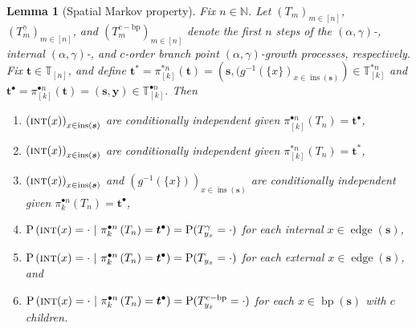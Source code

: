 \documentclass[a4paper, final]{amsart}
\theoremstyle{plain}
\newtheorem{lemma}[thm]{Lemma}
\theoremstyle{definition}
\newcommand{\tree}[1][t]{\boldsymbol{#1}}
\newcommand{\T}{\mathbb{T}}
\DeclareMathOperator{\edge}{edge}
\DeclareMathOperator{\insertable}{ins}
\DeclareMathOperator{\branchpoints}{bp}
\DeclareMathOperator{\intstruct}{\textsc{int}}
\newcommand{\insertablef}[1][\tree]{\insertable({\tree[#1]})}
\renewcommand{\P}{\mathrm{P}}
\newcommand{\N}{\mathbb{N}}
\begin{document}
\begin{lemma}[Spatial Markov property]\label{lemma:spatialMarkovProperty}
  Fix $n \in \N$.
  Let ${\left( T_m \right)}_{m \in [n]}$, ${\left( T_m^\gamma \right)}_{m \in [n]}$, and ${\left( T_m^{c-\text{bp}} \right)}_{m \in [n]}$ denote the first $n$ steps of the $(\alpha, \gamma)$-, internal $(\alpha, \gamma)$-, and $c$-order branch point $(\alpha, \gamma)$-growth processes, respectively.
  Fix $\tree \in \T_{[n]}$, and define $\tree^* = \pi_{[k]}^{*n} (\tree) = (\tree[s], {(g^{-1}(\{x\})}_{x \in \insertablef[s]}) \in \T_{[k]}^{*n}$ and $\tree^\bullet = \pi_{[k]}^{\bullet n} (\tree) = (\tree[s], \mathbf{y}) \in \T_{[k]}^{\bullet n}$.
Then
%
\begin{enumerate}
  \item\label{lemma:spatial1} ${\left( \intstruct (x) \right)}_{x \in \insertablef[s]}$ are conditionally independent given $\pi_{[k]}^{\bullet n} \left( T_n \right) = \tree^\bullet$,
  \item\label{lemma:spatial1a} ${\left( \intstruct (x) \right)}_{x \in \insertablef[s]}$ are conditionally independent given $\pi_{[k]}^{* n} \left( T_n \right) = \tree^*$,
  \item\label{lemma:spatial2} ${\left( \intstruct (x) \right)}_{x \in \insertablef[s]}$ and ${\left( g^{-1}(\{x\}) \right)}_{x \in \insertablef[s]}$ are conditionally independent given $\pi_k^{\bullet n} \left( T_n \right) = \tree^\bullet$,
    \item\label{lemma:spatial3} $\P \left( \intstruct (x) = \cdot \ \middle \vert \ \pi_k^{\bullet n} \left( T_n \right) = \tree^\bullet \right) = \P(T_{y_x}^\gamma = \cdot )$ for each internal $x \in \edge (\tree[s])$,
    \item\label{lemma:spatial4} $\P \left( \intstruct (x) = \cdot \ \middle \vert \ \pi_k^{\bullet n} \left( T_n \right) = \tree^\bullet \right) = \P(T_{y_x} = \cdot )$ for each external $x \in \edge (\tree[s])$, and
    \item\label{lemma:spatial5} $\P \left( \intstruct (x) = \cdot \ \middle \vert \ \pi_k^{\bullet n} \left( T_n \right) = \tree^\bullet \right) = \P(T_{y_x}^{c-\text{bp}} = \cdot )$ for each $x \in \branchpoints (\tree[s])$ with $c$ children.
  \end{enumerate}
  \label{lemma:InternalStructure}
\end{lemma}
%
\end{document}
